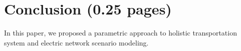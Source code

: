 \section{Conclusion (0.25 pages)}
\label{section:conclusion}

In this paper, we proposed a parametric approach to holistic transportation system and electric network scenario modeling.

